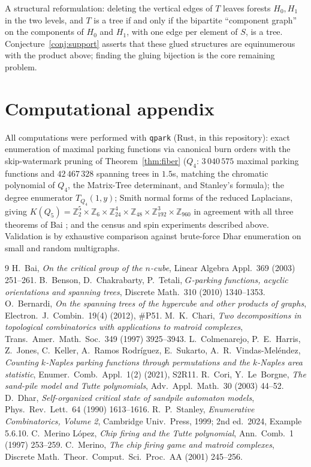 \documentclass[11pt]{amsart}
\theoremstyle{definition}
\newcommand{\ZZ}{\mathbb{Z}}
\begin{document}
A structural reformulation: deleting the vertical edges of $T$ leaves
forests $H_0, H_1$ in the two levels, and $T$ is a tree if and only if the
bipartite ``component graph'' on the components of $H_0$ and $H_1$, with one
edge per element of $S$, is a tree. Conjecture~\ref{conj:support} asserts
that these glued structures are equinumerous with the product above; finding
the gluing bijection is the core remaining problem.

\section{Computational appendix}

All computations were performed with \texttt{qpark} (Rust, in this
repository): exact enumeration of maximal parking functions via canonical
burn orders with the skip-watermark pruning of Theorem~\ref{thm:fiber}
($Q_4$: $3\,040\,575$ maximal parking functions and $42\,467\,328$ spanning
trees in $1.5$s, matching the chromatic polynomial of $Q_4$, the Matrix-Tree
determinant, and Stanley's formula); the degree enumerator
$T_{Q_4}(1,y)$; Smith normal forms of the reduced Laplacians, giving
$K(Q_5)=\ZZ_2^5\times\ZZ_6\times\ZZ_{24}^4\times\ZZ_{48}\times
\ZZ_{192}^3\times\ZZ_{960}$ in agreement with all three theorems of Bai
\cite{bai}; and the census and spin experiments described above. Validation
is by exhaustive comparison against brute-force Dhar enumeration on small
and random multigraphs.

\begin{thebibliography}{9}
 H.~Bai, \emph{On the critical group of the $n$-cube}, Linear
Algebra Appl.\ 369 (2003) 251--261.
 B.~Benson, D.~Chakrabarty, P.~Tetali, \emph{$G$-parking
functions, acyclic orientations and spanning trees}, Discrete Math.\ 310
(2010) 1340--1353.
 O.~Bernardi, \emph{On the spanning trees of the hypercube
and other products of graphs}, Electron.\ J.\ Combin.\ 19(4) (2012), \#P51.
 M.~K.~Chari, \emph{Two decompositions in topological
combinatorics with applications to matroid complexes}, Trans.\ Amer.\ Math.\
Soc.\ 349 (1997) 3925--3943.
 L.~Colmenarejo, P.~E.~Harris, Z.~Jones, C.~Keller,
A.~Ramos Rodr\'iguez, E.~Sukarto, A.~R.~Vindas-Mel\'endez, \emph{Counting
$k$-Naples parking functions through permutations and the $k$-Naples area
statistic}, Enumer.\ Comb.\ Appl.\ 1(2) (2021), S2R11.
 R.~Cori, Y.~Le~Borgne, \emph{The sand-pile model and Tutte
polynomials}, Adv.\ Appl.\ Math.\ 30 (2003) 44--52.
 D.~Dhar, \emph{Self-organized critical state of sandpile
automaton models}, Phys.\ Rev.\ Lett.\ 64 (1990) 1613--1616.
 R.~P.~Stanley, \emph{Enumerative Combinatorics, Volume 2},
Cambridge Univ.\ Press, 1999; 2nd ed.\ 2024, Example 5.6.10.
 C.~Merino L\'opez, \emph{Chip firing and the Tutte
polynomial}, Ann.\ Comb.\ 1 (1997) 253--259.
 C.~Merino, \emph{The chip firing game and matroid
complexes}, Discrete Math.\ Theor.\ Comput.\ Sci.\ Proc.\ AA (2001)
245--256.
\end{thebibliography}
\end{document}
